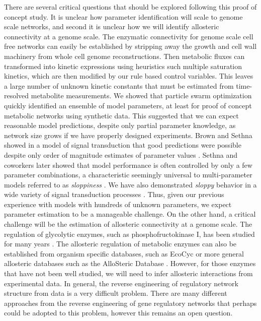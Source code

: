 \documentclass[processes,article,accept,moreauthors,pdftex,12pt,a4paper]{mdpi}
\begin{document}
There are several critical questions that should be explored following this proof of concept study.
It is unclear how parameter identification will scale to genome scale networks, and second it is unclear how we will identify allosteric connectivity at a genome scale. 
The enzymatic connectivity for genome scale cell free networks can easily be established by stripping away the growth and cell wall machinery from whole cell genome reconstructions.
Then metabolic fluxes can transformed into kinetic expressions using heuristics such multiple saturation kinetics, which are then modified by our rule based control variables.  
This leaves a large number of unknown kinetic constants that must be estimated from time-resolved metabolite measurements.
We showed that particle swarm optimization quickly identified an ensemble of model parameters, at least for proof of concept metabolic networks using synthetic data.
This suggested that we can expect reasonable model predictions, despite only partial parameter knowledge, as network size grows if we have properly designed experiments. 
Brown and Sethna showed in a model of signal transduction that good predictions were possible despite only order of magnitude estimates of parameter values \citep{Brown:2003aa}.
Sethna and coworkers later showed that model performance is often controlled by only a few parameter combinations, 
a characteristic seemingly universal to multi-parameter models referred to as \textit{sloppiness} \citep{Machta:2013aa}.
We have also demonstrated \textit{sloppy} behavior in a wide variety of signal transduction processes \citep{Luan:2007aa,Song:2009aa,Tasseff:2010aa,Tasseff:2011aa,Nayak:2011aa,Lequieu:2011aa}.
Thus, given our previous experience with models with hundreds of unknown parameters, we expect parameter estimation to be a manageable challenge. 
On the other hand, a critical challenge will be the estimation of allosteric connectivity at a genome scale. 
The regulation of glycolytic enzymes, such as phosphofructokinase I, has been studied for many years \citep{BERG_BIOCHEMISTRY,Peskov:2008aa}. 
The allosteric regulation of metabolic enzymes can also be established from organism specific databases, such as EcoCyc \citep{Keseler:2013aa} 
or more general allosteric databases such as the AlloSteric Database \citep{Huang:2014aa}. 
However, for those enzymes that have not been well studied, we will need to infer allosteric interactions from experimental data.
In general, the reverse engineering of regulatory network structure from data is a very difficult problem.
There are many different approaches from the reverse engineering of gene regulatory networks that perhaps could be adopted to this problem, however this remains an open question.
\end{document}
